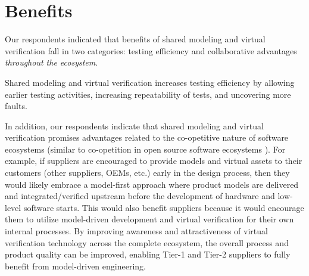 \section{Benefits} \label{sec:benefits}
Our respondents indicated that %
benefits of shared modeling and virtual verification fall in two categories:
testing efficiency and collaborative advantages \emph{throughout the ecosystem}.

Shared modeling and virtual verification increases testing efficiency by allowing earlier testing activities, increasing repeatability of tests, and uncovering more faults. 


In addition, %
our respondents indicate that shared modeling and virtual verification promises advantages related to the co-opetitive nature of software ecosystems (similar to co-opetition in open source software ecosystems \cite{Agerfalk2008}).
%
%
For example, if suppliers are encouraged to provide models and virtual assets to their customers (other suppliers, OEMs, etc.) early in the design process, then they would likely embrace a model-first approach where product models are delivered and integrated/verified upstream before the development of hardware and low-level software starts.
This would also benefit suppliers because it would encourage them to utilize model-driven development and virtual verification for their own internal processes.
By improving awareness and attractiveness of virtual verification technology across the complete ecosystem, the overall process and product quality can be improved, enabling Tier-1 and Tier-2 suppliers to fully benefit from model-driven engineering.

